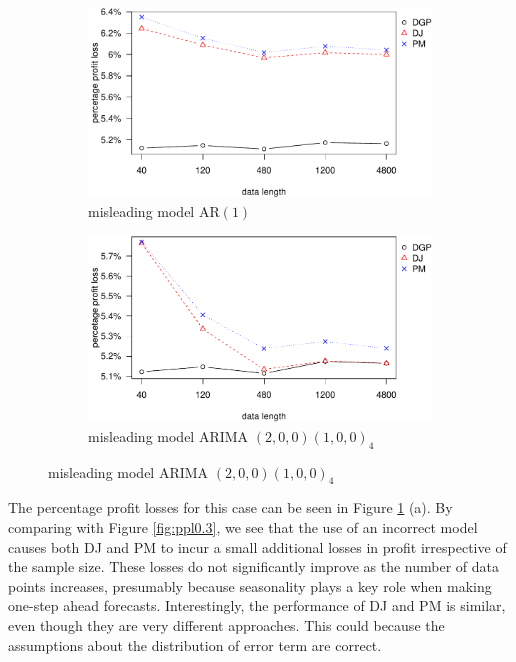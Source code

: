 \documentclass{article}
\begin{document}
\begin{figure}
\centering
\caption{Percentage profit loss vs. data size in misleading model}
\begin{subfigure}[b]{0.48\textwidth}
\centering
\includegraphics[width=\textwidth]{information-plot_files/figure-latex/AR(1)ppl-1.pdf}
\caption{misleading model AR$(1)$}
\end{subfigure}
\hfill
\begin{subfigure}[b]{0.48\textwidth}
\centering
\includegraphics[width=\textwidth]{information-plot_files/figure-latex/SAR(3)(1)_4ppl-1.pdf}
\caption{misleading model ARIMA $(2,0,0)(1,0,0)_4$}
\end{subfigure}
\label{fig:mis}
\end{figure}

The percentage profit losses for this case can be seen in Figure
\ref{fig:mis} (a). By comparing with Figure \ref{fig:ppl0.3}, we see that the use of an incorrect model causes both DJ and PM to incur a small additional losses in profit irrespective of the sample size. These losses do not significantly improve as the number of data points increases, presumably because seasonality plays a key role when making one-step ahead forecasts. Interestingly, the performance of DJ and PM is similar, even though they are very different approaches. This could because the assumptions about the distribution of error term are correct.
\end{document}
